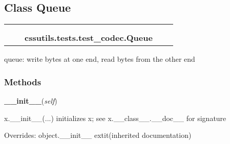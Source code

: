 \subsection{Class Queue}

    \label{cssutils:tests:test_codec:Queue}
\begin{tabular}{cccccc}
\multicolumn{2}{r}{\settowidth{\BCL}{object}\multirow{2}{\BCL}{object}}
&&
  \\\cline{3-3}
  &&\multicolumn{1}{c|}{}
&&
  \\
&&\multicolumn{2}{l}{\textbf{cssutils.tests.test\_codec.Queue}}
\end{tabular}

queue: write bytes at one end, read bytes from the other end



  \subsubsection{Methods}

    \vspace{0.5ex}

\hspace{.8\funcindent}\begin{boxedminipage}{\funcwidth}

    \raggedright \textbf{\_\_init\_\_}(\textit{self})

\setlength{\parskip}{2ex}
    x.\_\_init\_\_(...) initializes x; see x.\_\_class\_\_.\_\_doc\_\_ for 
    signature

\setlength{\parskip}{1ex}
      Overrides: object.\_\_init\_\_ 	extit{(inherited documentation)}

    \end{boxedminipage}

    \label{cssutils:tests:test_codec:Queue:write}

    \vspace{0.5ex}

